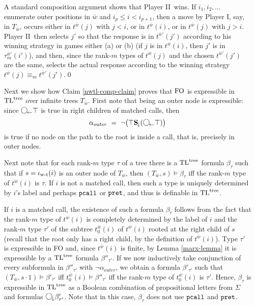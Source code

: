 \documentclass{LMCS}
\newcommand{\dupl}{Player II}
\newcommand{\spoiler}{Player I}
\newcommand{\w}{{\bar{w}}}
\newcommand{\sProof}[1]{\vspace{2mm}{\noindent\em Proof.~}#1\qed}
\newcommand{\X}{{\mathbf X}}
\renewcommand{\S}{{\mathbf S}}
\newcommand{\next}{\text{\raisebox{1pt}{$\bigcirc$}}}
\renewcommand{\X}{\next}
\newcommand{\Xd}{\X_{\!\downarrow}}
\newcommand{\Yr}{\X_{\!\leftarrow}}
\newcommand{\Sd}{\S_{\!\downarrow}}
\newcommand{\FO}{{\rm FO}}
\newcommand{\wt}{\iota_{\text{\rm w-t}}}
\theoremstyle{plain}
\theoremstyle{definition}
\newcommand{\pret}{\tt{pret}}
\newcommand{\pcall}{\tt{pcall}}
\newcommand{\tltree}{\text{\rm TL}^{\text{\rm tree}}}
\newcommand{\efeq}{\equiv}
\begin{document}
{\sProof{A standard composition argument shows that \dupl\ wins. If $i_1,i_2,\ldots$
enumerate outer positions in $\w$ and $i_p \leq i < i_{p+1}$, then a
move by \spoiler, say, in $T_\w$, occurs either in $t^\w(j)$ with
$j < i$, or in $t^\w(i)$, or in $t^\w(j)$ with $j > i$. \dupl\
then selects $j'$ so that the response is in $t^{\w'}(j')$ according
to his winning strategy in games either (a) or (b) (if $j$ is in
$t^\w(i)$, then $j'$ is in $\tau_m^{\w'}(i')$), and then, since the
rank-$m$ types of $t^\w(j)$ and the chosen $t^{\w'}(j')$ are the same,
selects the actual response according to the winning strategy
$t^\w(j)\efeq_m t^{\w'}(j')$.}

Next we show how Claim \ref{nwtl-comp-claim} proves that $\FO$ is
expressible in $\tltree$ over infinite trees $T_\w$. 
First note that being an outer node is expressible: since $\Yr\top$ is
true in right children of matched calls, then 
$$\alpha_{outer}\ = \ \neg \big(\top \Sd (\Yr\top)\big)$$
is true if no node on the path to the root is inside a call, that is,
precisely in outer nodes. 

Next note that for each rank-$m$ type $\tau$ of a tree there is a $\tltree$
formula $\beta_\tau$ such that if $s=\wt(i)$ is an outer node of
$T_\w$, then $(T_\w,s)\models\beta_\tau$ iff the rank-$m$ type of
$t^\w(i)$ is $\tau$. If $i$ is not a matched call, then such a type is
uniquely determined by $i$'s label and perhaps $\pcall$ or $\pret$,
and thus is definable in $\tltree$. 

If $i$ is a matched call, the existence of such a formula $\beta_\tau$ 
follows from the fact that the rank-$m$ type of
$t^\w(i)$ is completely determined by the label of $i$ and the
rank-$m$ type $\tau'$ of the subtree $t^\w_0(i)$ of $t^\w(i)$ rooted
at the right child of $s$ (recall that the root only has a right
child, by the definition of $t^\w(i)$). Type $\tau'$ is expressible in
FO and, since $t^\w(i)$ is finite, by Lemma \ref{marx-lemma} it is
expressible by a $\tltree$ formula $\beta''_{\tau'}$. If we now
inductively take conjunction of every subformula in $\beta''_{\tau'}$
with $\neg\alpha_{outer}$, we obtain  
a formula $\beta'_{\tau'}$ such that 
$(T_\w,s\cdot 1)\models \beta'_{\tau'}$ iff 
$t^\w_0(i) \models \beta''_{\tau'}$ iff 
the rank-$m$ type of $t^\w_0(i)$ is
$\tau'$. 
Hence, $\beta_\tau$ is expressible in $\tltree$ as a Boolean
combination of propositional letters from $\Sigma$ and formulas $\Xd
\beta'_{\tau'}$. Note that in this case, $\beta_\tau$ does not use
$\pcall$ and $\pret$. 

}
\end{document}
